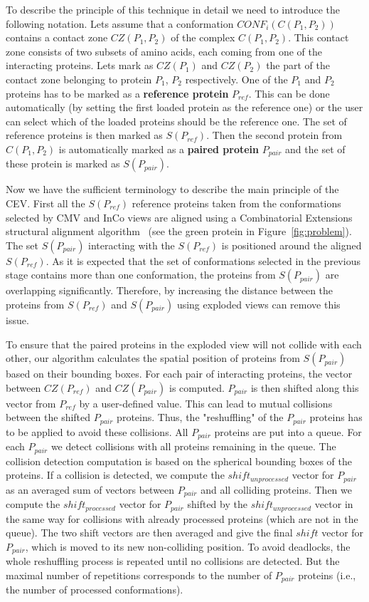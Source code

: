 \documentclass[journal]{vgtc}                %
\begin{document}
To describe the principle of this technique in detail we need to introduce the following notation.
Lets assume that a conformation $CONF_i(C(P_1,P_2))$ contains a contact zone $CZ(P_1,P_2)$ of the complex $C(P_1,P_2)$.
This contact zone consists of two subsets of amino acids, each coming from one of the interacting proteins.
Lets mark as $CZ(P_1)$ and $CZ(P_2)$ the part of the contact zone belonging to protein $P_1$, $P_2$ respectively.
One of the $P_1$ and $P_2$ proteins has to be marked as a \textbf{reference protein} $P_{ref}$.
This can be done automatically (by setting the first loaded protein as the reference one) or the user can select which of the loaded proteins should be the reference one.
The set of reference proteins is then marked as $S(P_{ref})$.
Then the second protein from $C(P_1,P_2)$ is automatically marked as a \textbf{paired protein} $P_{pair}$ and the set of these protein is marked as $S(P_{pair})$.

Now we have the sufficient terminology to describe the main principle of the CEV.
First all the $S(P_{ref})$ reference proteins taken from the conformations selected by CMV and InCo views are aligned using a Combinatorial Extensions structural alignment algorithm~\cite{Shindyalov1998} (see the green protein in Figure~\ref{fig:problem}).
The set $S(P_{pair})$ interacting with the $S(P_{ref})$ is positioned around the aligned $S(P_{ref})$.
As it is expected that the set of conformations selected in the previous stage contains more than one conformation, the proteins from $S(P_{pair})$ are overlapping significantly.
Therefore, by increasing the distance between the proteins from $S(P_{ref})$ and $S(P_{pair})$ using exploded views can remove this issue.

To ensure that the paired proteins in the exploded view will not collide with each other, our algorithm calculates the spatial position of proteins from $S(P_{pair})$ based on their bounding boxes.
For each pair of interacting proteins, the vector between $CZ(P_{ref})$ and $CZ(P_{pair})$ is computed. 
$P_{pair}$ is then shifted along this vector from $P_{ref}$ by a user-defined value. 
This can lead to mutual collisions between the shifted $P_{pair}$ proteins.
Thus, the "reshuffling" of the $P_{pair}$ proteins has to be applied to avoid these collisions. 
All $P_{pair}$ proteins are put into a queue.
For each $P_{pair}$ we detect collisions with all proteins remaining in the queue.
The collision detection computation is based on the spherical bounding boxes of the proteins.
If a collision is detected, we compute the $shift_{unprocessed}$ vector for $P_{pair}$ as an averaged sum of vectors between $P_{pair}$ and all colliding proteins.
Then we compute the $shift_{processed}$ vector for $P_{pair}$ shifted by the $shift_{unprocessed}$ vector in the same way for collisions with already processed proteins (which are not in the queue).
The two shift vectors are then averaged and give the final $shift$ vector for $P_{pair}$, which is moved to its new non-colliding position.
To avoid deadlocks, the whole reshuffling process is repeated until no collisions are detected.
But the maximal number of repetitions corresponds to the number of $P_{pair}$ proteins (i.e., the number of processed conformations).
\end{document}
